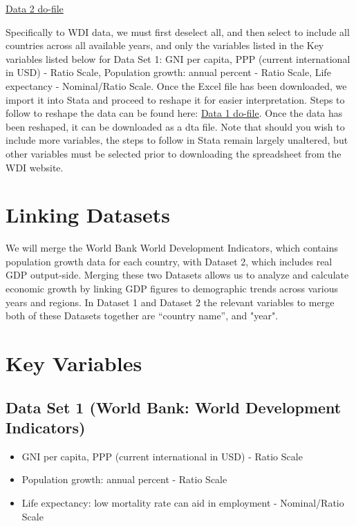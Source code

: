 \documentclass[12pt]{article}
\begin{document}
\href{https://github.com/ecn310/course-project-development/blob/main/Penn%20World%20Table%20(PWT)%20version%2010.01.do}{Data 2 do-file} 

Specifically to WDI data, we must first deselect all, and then select to include all countries across all available years, and only the variables listed in the Key variables listed below for Data Set 1: GNI per capita, PPP (current international in USD) - Ratio Scale, Population growth: annual percent -  Ratio Scale,  Life expectancy - Nominal/Ratio Scale. Once the Excel file has been downloaded, we import it into Stata and proceed to reshape it for easier interpretation. Steps to follow to reshape the data can be found here: \href{https://github.com/ecn310/course-project-development/blob/main/WDI.do}{Data 1 do-file}.
Once the data has been reshaped, it can be downloaded as a dta file. Note that should you wish to include more variables, the steps to follow in Stata remain largely unaltered, but other variables must be selected prior to downloading the spreadsheet from the WDI website. 


\section{Linking Datasets}
\label{sec:discussion}

We will merge the World Bank World Development Indicators, which contains population growth data for each country, with Dataset 2, which includes real GDP output-side. Merging these two Datasets allows us to analyze and calculate economic growth by linking GDP figures to demographic trends across various years and regions. In Dataset 1 and Dataset 2 the relevant variables to merge both of these Datasets together are “country name”, and "year". 


\section{Key Variables}
\label{sec:result}


\subsection{Data Set 1 (World Bank: World Development Indicators)}

\begin{itemize}
    \item GNI per capita, PPP (current international in USD) - Ratio Scale 
    \item Population growth: annual percent -  Ratio Scale 
    \item Life expectancy: low mortality rate can aid in employment - Nominal/Ratio Scale 
\end{itemize}
\end{document}
